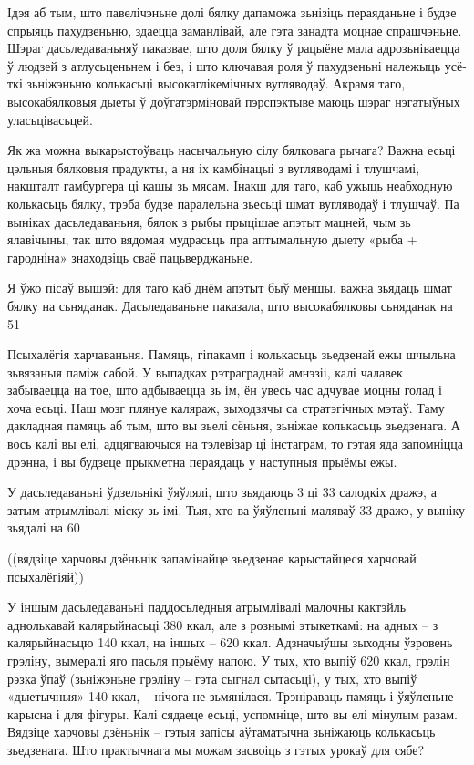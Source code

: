 Ідэя аб тым, што павелічэньне долі бялку дапаможа зьнізіць пераяданьне і будзе спрыяць пахудзеньню, здаецца заманлівай, але гэта занадта моцнае спрашчэньне. Шэраг дасьледаваньняў паказвае, што доля бялку ў рацыёне мала адрозьніваецца ў людзей з атлусьценьнем і без, і што ключавая роля ў пахудзеньні належыць усё-ткі зьніжэньню колькасьці высокаглікемічных вугляводаў. Акрамя таго, высокабялковыя дыеты ў доўгатэрміновай пэрспэктыве маюць шэраг нэгатыўных уласьцівасьцей.

Як жа можна выкарыстоўваць насычальную сілу бялковага рычага? Важна есьці цэльныя бялковыя прадукты, а ня іх камбінацыі з вугляводамі і тлушчамі, накшталт гамбургера ці кашы зь мясам. Інакш для таго, каб ужыць неабходную колькасьць бялку, трэба будзе паралельна зьесьці шмат вугляводаў і тлушчаў. Па выніках дасьледаваньня, бялок з рыбы прыцішае апэтыт мацней, чым зь ялавічыны, так што вядомая мудрасьць пра аптымальную дыету «рыба + гародніна» знаходзіць сваё пацьверджаньне.

Я ўжо пісаў вышэй: для таго каб днём апэтыт быў меншы, важна зьядаць шмат бялку на сьняданак. Дасьледаваньне паказала, што высокабялковы сьняданак на 51%

Псыхалёгія харчаваньня. Памяць, гіпакамп і колькасьць зьедзенай ежы шчыльна зьвязаныя паміж сабой. У выпадках рэтраграднай амнэзіі, калі чалавек забываецца на тое, што адбываецца зь ім, ён увесь час адчувае моцны голад і хоча есьці. Наш мозг плянуе каляраж, зыходзячы са стратэгічных мэтаў. Таму дакладная памяць аб тым, што вы зьелі сёньня, зьніжае колькасьць зьедзенага. А вось калі вы елі, адцягваючыся на тэлевізар ці інстаграм, то гэтая яда запомніцца дрэнна, і вы будзеце прыкметна пераядаць у наступныя прыёмы ежы.

У дасьледаваньні ўдзельнікі ўяўлялі, што зьядаюць 3 ці 33 салодкіх дражэ, а затым атрымлівалі міску зь імі. Тыя, хто ва ўяўленьні маляваў 33 дражэ, у выніку зьядалі на 60%

((вядзіце харчовы дзёньнік запамінайце зьедзенае карыстайцеся харчовай псыхалёгіяй))

У іншым дасьледаваньні паддосьледныя атрымлівалі малочны кактэйль аднолькавай калярыйнасьці 380 ккал, але з рознымі этыкеткамі: на адных – з калярыйнасьцю 140 ккал, на іншых – 620 ккал. Адзначыўшы зыходны ўзровень грэліну, вымералі яго пасьля прыёму напою. У тых, хто выпіў 620 ккал, грэлін рэзка ўпаў (зьніжэньне грэліну – гэта сыгнал сытасьці), у тых, хто выпіў «дыетычныя» 140 ккал, – нічога не зьмянілася. Трэніраваць памяць і ўяўленьне – карысна і для фігуры. Калі сядаеце есьці, успомніце, што вы елі мінулым разам. Вядзіце харчовы дзёньнік – гэтыя запісы аўтаматычна зьніжаюць колькасьць зьедзенага. Што практычнага мы можам засвоіць з гэтых урокаў для сябе?


